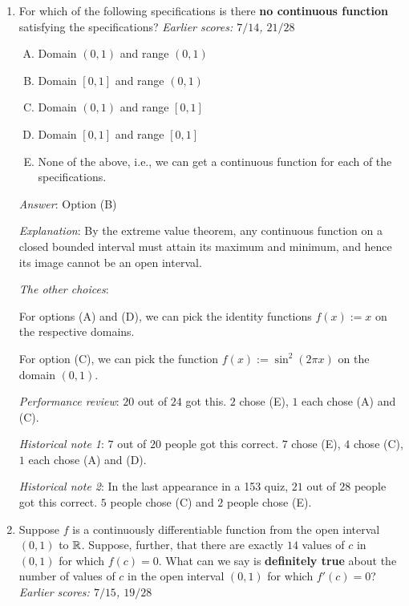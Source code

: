 \documentclass[10pt]{amsart}
\begin{document}
\begin{enumerate}
  {\em Performance review}: $17$ out of $24$ got this. $4$ chose (D),
  $3$ chose (E).

  {\em Historical note 1}: $7$ out of $20$ students got this
  correct. $6$ chose (D), $5$ chose (C), $2$ chose (A).

  {\em Historical note 2}: In the last appearance in a 153 quiz, $16$
  out of $28$ people got this correct. $7$ people chose (A), $2$
  people each chose (C) and (E), and $1$ person chose (D).
\item For which of the following specifications is there {\bf no
  continuous function} satisfying the specifications? {\em Earlier
  scores: $7/14$, $21/28$}

  \begin{enumerate}[(A)]
  \item Domain $(0,1)$ and range $(0,1)$
  \item Domain $[0,1]$ and range $(0,1)$
  \item Domain $(0,1)$ and range $[0,1]$
  \item Domain $[0,1]$ and range $[0,1]$
  \item None of the above, i.e., we can get a continuous function for
    each of the specifications.
  \end{enumerate}

  {\em Answer}: Option (B)

  {\em Explanation}: By the extreme value theorem, any continuous
  function on a closed bounded interval must attain its maximum and
  minimum, and hence its image cannot be an open interval.

  {\em The other choices}:

  For options (A) and (D), we can pick the identity functions $f(x) :=
  x$ on the respective domains.

  For option (C), we can pick the function $f(x) := \sin^2(2\pi x)$ on
  the domain $(0,1)$. 

  {\em Performance review}: $20$ out of $24$ got this. $2$ chose (E),
  $1$ each chose (A) and (C).

  {\em Historical note 1}: $7$ out of $20$ people got this
  correct. $7$ chose (E), $4$ chose (C), $1$ each chose (A) and (D).

  {\em Historical note 2}: In the last appearance in a 153 quiz, $21$
  out of $28$ people got this correct. $5$ people chose (C) and $2$
  people chose (E).

\item Suppose $f$ is a continuously differentiable function from the
  open interval $(0,1)$ to $\mathbb{R}$. Suppose, further, that there are
  exactly $14$ values of $c$ in $(0,1)$ for which $f(c) = 0$. What can
  we say is {\bf definitely true} about the number of values of $c$ in
  the open interval $(0,1)$ for which $f'(c) = 0$? {\em Earlier scores:
  $7/15$, $19/28$}


\end{enumerate}
\end{document}
